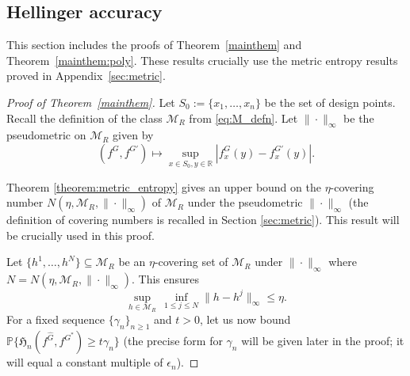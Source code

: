 \documentclass[11pt]{article}
\numberwithin{equation}{section}
\newcommand{\PP}{\mathbb{P}}
\begin{document}
\begin{appendices}
\section{Hellinger accuracy}

This section includes the proofs of Theorem~\ref{mainthem} and Theorem~\ref{mainthem:poly}. These results crucially use the metric entropy results proved in Appendix~\ref{sec:metric}. 

\begin{proof}[Proof of Theorem~\ref{mainthem}]
  Let $S_0 := \{x_1, \dots, x_n\}$ be the set of design points. Recall the definition of the class $\mathcal{M}_R$ from \eqref{eq:M_defn}. Let $\|\cdot\|_{\infty}$ be the pseudometric on $\mathcal{M}_R$ given by
  \begin{equation*}
 (f^G, f^{G'}) \mapsto \sup_{x \in S_0, y \in \mathbb{R}} \left|f_x^G(y) - f_x^{G'}(y) \right|. 
  \end{equation*}

Theorem \ref{theorem:metric_entropy} gives an upper bound on the $\eta$-covering number $N(\eta, \mathcal{M}_{R}, \|\cdot\|_{\infty})$ of  $\mathcal{M}_R$ under the  pseudometric $\|\cdot\|_{\infty}$ (the definition of covering numbers is recalled in Section \ref{sec:metric}). This result will be crucially used in this proof. 


Let $\{ h^1, \dots, h^N\} \subseteq \mathcal{M}_R$ be an $\eta$-covering set of $\mathcal{M}_R$ under  $\| \cdot \|_{\infty}$ where $N = N(\eta, \mathcal{M}_R, \| \cdot \|_{\infty})$. This ensures 
\begin{equation}
\underset{h \in \mathcal{M}_R}{\sup} \, \underset{1\leq j \leq N}{\inf} \| h - h^j\|_{\infty} \leq \eta.
\label{eq:metric}
\end{equation}
For a fixed sequence $\{\gamma_n\}_{n \geq 1}$ and $t > 0$, let us now bound $\PP \{\mathfrak{H}_n(f^{\hat{G}},f^{G^*})\geq t \gamma_n\}$ (the precise form for $\gamma_n$ will be given later in the proof; it will equal a constant multiple of $\epsilon_n$).   


\end{proof}
\end{appendices}
\end{document}
